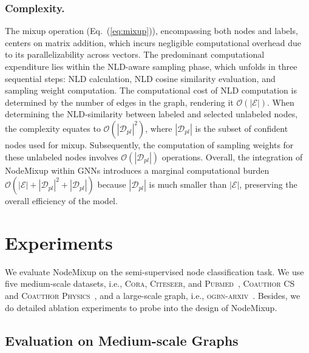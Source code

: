 \documentclass[letterpaper]{article} %
\begin{document}
\subsubsection{Complexity.}
The mixup operation (Eq.~(\ref{eq:mixup})), encompassing both nodes and labels, centers on matrix addition, which incurs negligible computational overhead due to its parallelizability across vectors. The predominant computational expenditure lies within the NLD-aware sampling phase, which unfolds in three sequential steps: NLD calculation, NLD cosine similarity evaluation, and sampling weight computation. The computational cost of NLD computation is determined by the number of edges in the graph, rendering it $\mathcal{O}(|\mathcal{E}|)$. When determining the NLD-similarity between labeled and selected unlabeled nodes, the complexity equates to $\mathcal{O}(|\mathcal{D}_{pl}|^{2})$, where $|\mathcal{D}_{pl}|$ is the subset of confident nodes used for mixup. Subsequently, the computation of sampling weights for these unlabeled nodes involves $\mathcal{O}(|\mathcal{D}_{pl}|)$ operations. Overall, the integration of NodeMixup within GNNs introduces a marginal computational burden $\mathcal{O}(|\mathcal{E}| + |\mathcal{D}_{pl}|^{2} + |\mathcal{D}_{pl}|)$ because $|\mathcal{D}_{pl}|$ is much smaller than $|\mathcal{E}|$, preserving the overall efficiency of the model.

\section{Experiments}
We evaluate NodeMixup on the semi-supervised node classification task. We  use five medium-scale datasets, i.e., \textsc{Cora}, \textsc{Citeseer}, and \textsc{Pubmed}~\cite{cora}, \textsc{Coauthor CS} and \textsc{Coauthor Physics}~\cite{coauthor}, and a large-scale graph, i.e., \textsc{ogbn-arxiv}~\cite{ogb}. Besides, we do detailed ablation experiments to probe into the design of NodeMixup.

\subsection{Evaluation on Medium-scale Graphs}
\end{document}

